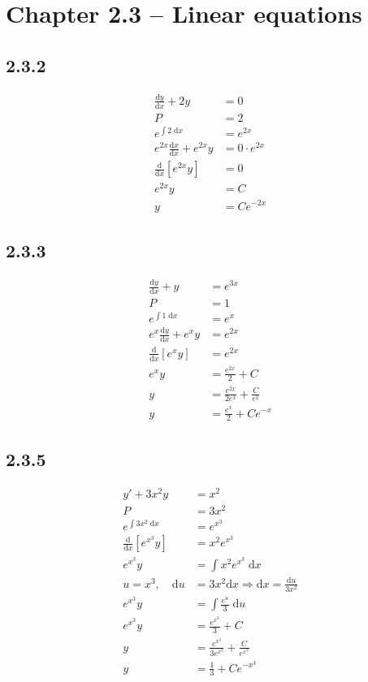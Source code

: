 \documentclass{article}
\begin{document}
\section{Chapter 2.3 -- Linear equations}

\subsection{2.3.2}
\begin{align*}
    \frac{\mathrm{d}y}{\mathrm{d}x} +2y&= 0\\
    P &= 2\\
    e^{\int 2 \; \mathrm{d}x} &= e^{2x}\\
    e^{2x}\frac{\mathrm{d}x}{\mathrm{d}x}+e^{2x}y &= 0\cdot e^{2x}\\
    \frac{\mathrm{d}}{\mathrm{d}x}[e^{2x}y] &= 0\\
    e^{2x}y &= C\\
    y &= Ce^{-2x}
\end{align*}

\subsection{2.3.3}
\begin{align*}
    \frac{\mathrm{d}y}{\mathrm{d}x}+y &= e^{3x}\\
    P &= 1\\
    e^{\int 1 \; \mathrm{d}x}  &= e^{x}\\
    e^{x}\frac{\mathrm{d}y}{\mathrm{d}x}+e^{x}y &= e^{2x}\\
    \frac{\mathrm{d}}{\mathrm{d}x}\left[e^{x}y\right] &= e^{2x}\\
    e^{x}y &= \frac{e^{2x}}{2}+C\\
    y &= \frac{e^{2x}}{2e^{x}}+\frac{C}{e^{x}}\\
    y &= \frac{e^{x}}{2}+Ce^{-x}
\end{align*}

\subsection{2.3.5}
\begin{align*}
    y'+3x^2y &= x^2 \\
    P &= 3x^2\\
    e^{\int 3x^2 \; \mathrm{d}x} &= e^{x^3} \\
    \frac{\mathrm{d}}{\mathrm{d}x}\left[e^{x^3}y\right] &= x^2e^{x^3}  \\
    e^{x^3}y &= \int x^2e^{x^3} \; \mathrm{d}x\\
    u = x^3,\quad  \mathrm{d}u &= 3x^2\mathrm{d}x \Rightarrow \mathrm{d}x =\frac{\mathrm{d}u}{3x^2}  \\
    e^{x^3}y &= \int \frac{e^{u}}{3} \; \mathrm{d}u\\
    e^{x^3}y &= \frac{e^{x^3}}{3}+C\\
    y &= \frac{e^{x^3}}{3e^{x^3}}+\frac{C}{e^{x^3}}\\
    y &= \frac{1}{3}+Ce^{-x^3}
\end{align*}
\end{document}
